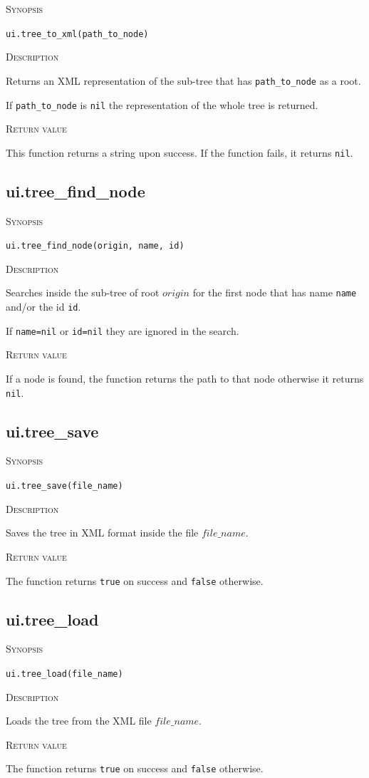 \documentclass[11pt]{report}
\newcommand{\mansection}[1]{\vspace{0.5em}\par\noindent\textsc{#1}\vspace{0.5em}\par}
\begin{document}
\mansection{Synopsis}
\texttt{ui.tree\_to\_xml(path\_to\_node)}

\mansection{Description}
  Returns an XML representation of the sub-tree that has \texttt{path\_to\_node} 
  as a root.
	  
  If \texttt{path\_to\_node} is \texttt{nil} the representation of the whole 
  tree is returned.
  
\mansection{Return value}
  This function returns a string upon success.
  If the function fails, it returns \texttt{nil}.


\subsection{ui.tree\_find\_node}

\mansection{Synopsis}
\texttt{ui.tree\_find\_node(origin, name, id)}

\mansection{Description}
  Searches inside the sub-tree of root $origin$ for the first node that has 
  name \texttt{name} and/or the id \texttt{id}.

  If \texttt{name=nil} or \texttt{id=nil} they are ignored in the search.

\mansection{Return value}
  If a node is found, the function returns the path to that node otherwise 
  it returns \texttt{nil}.


\subsection{ui.tree\_save}

\mansection{Synopsis}
\texttt{ui.tree\_save(file\_name)}

\mansection{Description}
  Saves the tree in XML format inside the file $file\_name$.

\mansection{Return value}
  The function returns \texttt{true} on success and \texttt{false} otherwise.


\subsection{ui.tree\_load}

\mansection{Synopsis}
\texttt{ui.tree\_load(file\_name)}

\mansection{Description}
  Loads the tree from the XML file $file\_name$.

\mansection{Return value}
  The function returns \texttt{true} on success and \texttt{false} otherwise.
\end{document}
